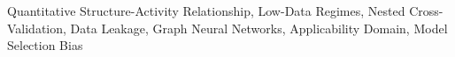 Quantitative Structure-Activity Relationship, Low-Data Regimes, Nested Cross-Validation, Data Leakage, Graph Neural Networks, Applicability Domain, Model Selection Bias
